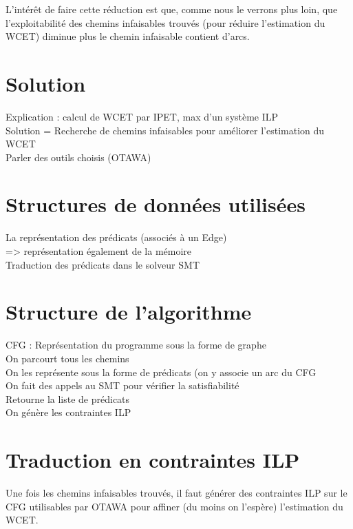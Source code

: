 \documentclass[french]{article}
\begin{document}
  L'intérêt de faire cette réduction est que, comme nous le verrons plus loin, %
  que l'exploitabilité des chemins infaisables trouvés (pour réduire l'estimation du WCET) diminue plus le chemin infaisable contient d'arcs.



  \section{Solution}
  Explication : calcul de WCET par IPET, max d'un système ILP\\
  Solution = Recherche de chemins infaisables pour améliorer l'estimation du WCET\\
  Parler des outils choisis (OTAWA)\\

  \section{Structures de données utilisées}
  La représentation des prédicats (associés à un Edge)\\
  => représentation également de la mémoire\\
  Traduction des prédicats dans le solveur SMT

  \section{Structure de l'algorithme}
  CFG : Représentation du programme sous la forme de graphe\\
  On parcourt tous les chemins\\
  On les représente sous la forme de prédicats (on y associe un arc du CFG\\
  On fait des appels au SMT pour vérifier la satisfiabilité\\
  Retourne la liste de prédicats\\
  On génère les contraintes ILP\\

  \section{Traduction en contraintes ILP}
  Une fois les chemins infaisables trouvés, il faut générer des contraintes ILP sur le CFG utilisables par OTAWA pour affiner (du moins on l'espère) l'estimation du WCET.
\end{document}
